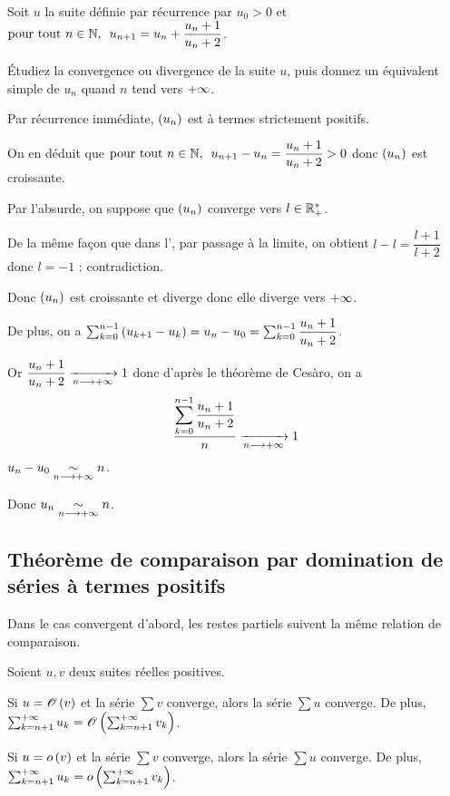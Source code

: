 \begin{exo}
Soit \(u\) la suite définie par récurrence par \(u_0>0\) et \(\quantifs{\tpt n\in\N}u_{n+1}=u_n+\dfrac{u_n+1}{u_n+2}\).

Étudiez la convergence ou divergence de la suite \(u\), puis donnez un équivalent simple de \(u_n\) quand \(n\) tend vers \(+\infty\).
\end{exo}

\begin{corr}
Par récurrence immédiate, \(\left(u_n\right)\) est à termes strictement positifs.

On en déduit que \(\quantifs{\tpt n\in\N}u_{n+1}-u_n=\dfrac{u_n+1}{u_n+2}>0\) donc \(\left(u_n\right)\) est croissante.

Par l'absurde, on suppose que \(\left(u_n\right)\) converge vers \(l\in\mathbb{R}_+^*\).

De la même façon que dans l', par passage à la limite, on obtient \(l-l=\dfrac{l+1}{l+2}\) donc \(l=-1\) : contradiction.

Donc \(\left(u_n\right)\) est croissante et diverge donc elle diverge vers \(+\infty\).

De plus, on a \(\sum_{k=0}^{n-1}\left(u_{k+1}-u_k\right)=u_n-u_0=\sum_{k=0}^{n-1}\dfrac{u_n+1}{u_n+2}\).

Or \(\dfrac{u_n+1}{u_n+2}\xrightarrow[n\longrightarrow+\infty]{}1\) donc d'après le théorème de Cesàro, on a \[\dfrac{\displaystyle\sum_{k=0}^{n-1}\dfrac{u_n+1}{u_n+2}}{n}\xrightarrow[n\longrightarrow+\infty]{}1\] \ie \(u_n-u_0\underset{n\longrightarrow+\infty}{\sim}n\).

Donc \(u_n\underset{n\longrightarrow+\infty}{\sim}n\).
\end{corr}

\subsection{Théorème de comparaison par domination de séries à termes positifs}

Dans le cas convergent d'abord, les restes partiels suivent la même relation de comparaison.

\begin{theo}
Soient \(u,v\) deux suites réelles positives.

Si \(u=\mathscr{O}\left(v\right)\) et la série \(\sum v\) converge, alors la série \(\sum u\) converge. De plus, \(\sum_{k=n+1}^{+\infty}u_k=\mathscr{O}\left(\sum_{k=n+1}^{+\infty}v_k\right)\).

Si \(u=o\left(v\right)\) et la série \(\sum v\) converge, alors la série \(\sum u\) converge. De plus, \(\sum_{k=n+1}^{+\infty}u_k=o\left(\sum_{k=n+1}^{+\infty}v_k\right)\).
\end{theo}

